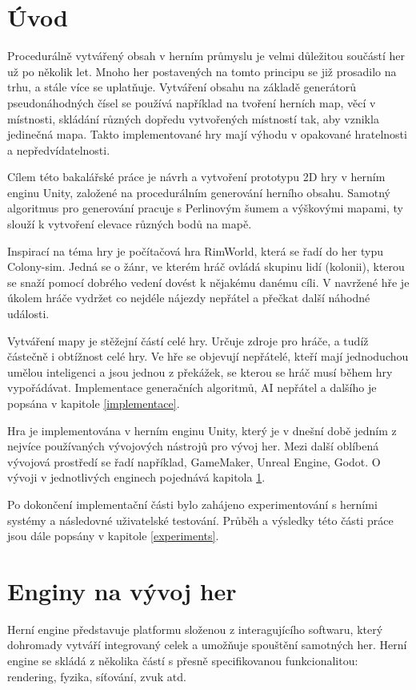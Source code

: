 
\chapter*{Úvod}
Procedurálně vytvářený obsah v herním průmyslu je velmi důležitou součástí her už po několik let. Mnoho her postavených na tomto principu se již prosadilo na trhu, a stále více se uplatňuje. Vytváření obsahu na základě generátorů pseudonáhodných čísel se používá například na tvoření herních map, věcí v místnosti, skládání různých dopředu vytvořených místností tak, aby vznikla jedinečná mapa. Takto implementované hry mají výhodu v opakované hratelnosti a nepředvídatelnosti.

Cílem této bakalářské práce je návrh a vytvoření prototypu 2D hry v herním enginu Unity, založené na procedurálním generování herního obsahu. Samotný algoritmus pro generování pracuje s Perlinovým šumem a výškovými mapami, ty slouží k vytvoření elevace různých bodů na mapě.

Inspirací na téma hry je počítačová hra RimWorld, která se řadí do her typu Colony-sim. Jedná se o žánr, ve kterém hráč ovládá skupinu lidí (kolonii), kterou se snaží pomocí dobrého vedení dovést k nějakému danému cíli. V navržené hře je úkolem hráče vydržet co nejdéle nájezdy nepřátel a přečkat další náhodné události.

Vytváření mapy je stěžejní částí celé hry. Určuje zdroje pro hráče, a tudíž částečně i obtížnost celé hry. Ve hře se objevují nepřátelé, kteří mají jednoduchou umělou inteligenci a jsou jednou z překážek, se kterou se hráč musí během hry vypořádávat. Implementace generačních algoritmů, AI nepřátel a dalšího je popsána v kapitole \ref{implementace}.

Hra je implementována v herním enginu Unity, který je v dnešní době jedním z nejvíce používaných vývojových nástrojů pro vývoj her. Mezi další oblíbená vývojová prostředí se řadí například, GameMaker, Unreal Engine, Godot. O vývoji v jednotlivých enginech pojednává kapitola \ref{engines}.

Po dokončení implementační části bylo zahájeno experimentování s herními systémy a následovné uživatelské testování. Průběh a výsledky této části práce jsou dále popsány v kapitole \ref{experiments}.

\newpage

\chapter{Enginy na vývoj her}
\label{engines}
Herní engine představuje platformu složenou z interagujícího softwaru, který dohromady vytváří integrovaný celek a umožňuje spouštění samotných her. Herní engine se skládá z několika částí s přesně specifikovanou funkcionalitou: rendering, fyzika, síťování, zvuk atd.~\cite{nilson2007game} 

